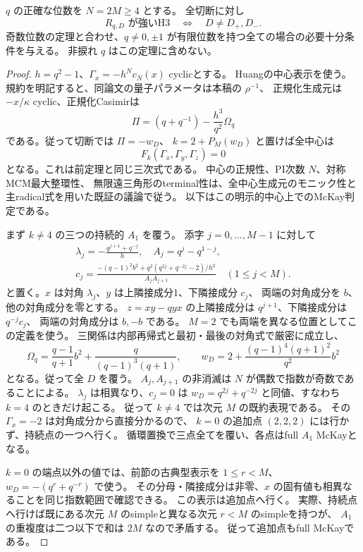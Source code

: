\begin{theorem}[全偶数位数の三角境界pencilの完全判定]
\label{thm:quantum-triangle-even-partial}
$q$ の正確な位数を $N=2M\ge4$ とする。
全切断に対し
\[
 R_{q,D}\text{ が強いH3}\quad\Longleftrightarrow\quad D\ne D_+,D_-.
\]
奇数位数の定理と合わせ、$q\ne0,\pm1$ が有限位数を持つ全ての場合の必要十分条件を与える。
非捩れ $q$ はこの定理に含めない。
\end{theorem}
\begin{proof}
$h=q^2-1$、$\Gamma_x=-h^Nc_N(x)$ cyclicとする。
Huangの中心表示\cite[Introduction, equation (5), Section 4.3]{HuangAWCentre}を使う。
規約を明記すると、同論文の量子パラメータは本稿の $\rho^{-1}$、
正規化生成元は $-x/\kappa$ cyclic、正規化Casimirは
\[
 \Pi=(q+q^{-1})-\frac{h^3}{q^2}\Omega_q
\]
である。従って切断では $\Pi=-w_D$、
$k=2+P_M(w_D)$ と置けば全中心は
\[
 F_k(\Gamma_x,\Gamma_y,\Gamma_z)=0
\]
となる。これは前定理と同じ三次式である。
中心の正規性、PI次数 $N$、対称MCM最大整環性、
無限遠三角形のterminal性は、全中心生成元のモニック性と
主radical式を用いた既証の議論で従う。
以下はこの明示的中心上でのMcKay判定である。

まず $k\ne4$ の三つの持続的 $A_1$ を覆う。
添字 $j=0,\ldots,M-1$ に対して
\[
 \begin{gathered}
 \lambda_j=-\frac{q^{j+1}+q^{-j}}h,\quad A_j=q^j-q^{1-j},\\
 c_j=\frac{-(q-1)^2b^2+q^2(q^{2j}+q^{-2j}-2)/h^2}{A_jA_{j+1}}
 \quad(1\le j<M).
 \end{gathered}
\]
と置く。$x$ は対角 $\lambda_j$、$y$ は上隣接成分1、下隣接成分 $c_j$、
両端の対角成分を $b$、他の対角成分を零とする。
$z=xy-qyx$ の上隣接成分は $q^{j+1}$、下隣接成分は $q^{-j}c_j$、
両端の対角成分は $b,-b$ である。
$M=2$ でも両端を異なる位置としてこの定義を使う。
三関係は内部再帰式と最初・最後の対角式で厳密に成立し、
\[
 \Omega_q=\frac{q-1}{q+1}b^2+\frac q{(q-1)^3(q+1)},\qquad
 w_D=2+\frac{(q-1)^4(q+1)^2}{q^2}b^2
\]
となる。従って全 $D$ を覆う。
$A_j,A_{j+1}$ の非消滅は $N$ が偶数で指数が奇数であることによる。
$\lambda_j$ は相異なり、$c_j=0$ は
$w_D=q^{2j}+q^{-2j}$ と同値、すなわち $k=4$ のときだけ起こる。
従って $k\ne4$ では次元 $M$ の既約表現である。
その $\Gamma_x=-2$ は対角成分から直接分かるので、
$k=0$ の追加点 $(2,2,2)$ には行かず、持続点の一つへ行く。
循環置換で三点全てを覆い、各点はfull $A_1$ McKayとなる。

$k=0$ の端点以外の値では、前節の古典型表示を
$1\le r<M$、$w_D=-(q^r+q^{-r})$ で使う。
その分母・隣接成分は非零、$x$ の固有値も相異なることを同じ指数範囲で確認できる。
この表示は追加点へ行く。
実際、持続点へ行けば既にある次元 $M$ のsimpleと異なる次元 $r<M$ のsimpleを持つが、
$A_1$ の重複度は二つ以下で和は $2M$ なので矛盾する。
従って追加点もfull McKayである。


\end{proof}

